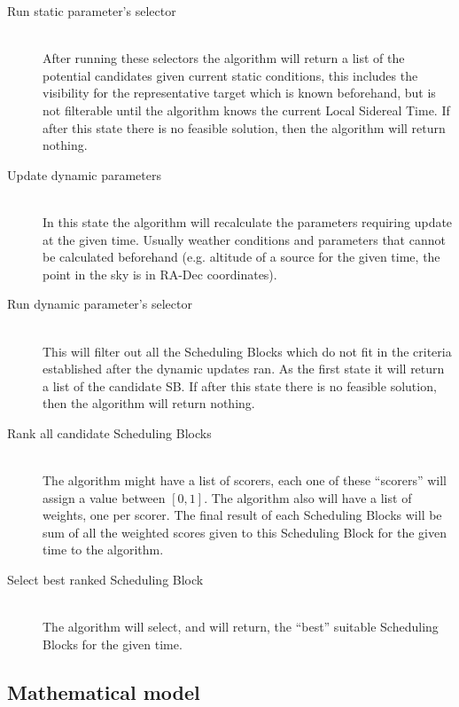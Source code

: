 \begin{description}
\item[Run static parameter's selector] \hfill \\
After running these selectors the algorithm will return a list of the potential candidates given current static conditions, this includes the visibility for the representative target which is known beforehand, but is not filterable until the algorithm knows the current Local Sidereal Time. If after this state there is no feasible solution, then the algorithm will return nothing.

\item[Update dynamic parameters] \hfill \\
In this state the algorithm will recalculate the parameters requiring update at the given time. Usually weather conditions and parameters that cannot be calculated beforehand (e.g. altitude of a source for the given time, the point in the sky is in RA-Dec coordinates).  

\item[Run dynamic parameter's selector] \hfill \\
This will filter out all the Scheduling Blocks which do not fit in the criteria established after the dynamic updates ran. As the first state it will return a list of the candidate SB. If after this state there is no feasible solution, then the algorithm will return nothing.

\item[Rank all candidate Scheduling Blocks] \hfill \\
The algorithm might have a list of scorers, each one of these ``scorers'' will assign a value between ${[ 0 , 1 ]}$. The algorithm also will have a list of weights, one per scorer. The final result of each Scheduling Blocks will be sum of all the weighted scores given to this Scheduling Block for the given time to the algorithm.

\item[Select best ranked Scheduling Block] \hfill \\
The algorithm will select, and will return, the ``best'' suitable Scheduling Blocks for the given time.

\end{description}


\subsection{Mathematical model}
\label{sec:array-sched-math-model}

